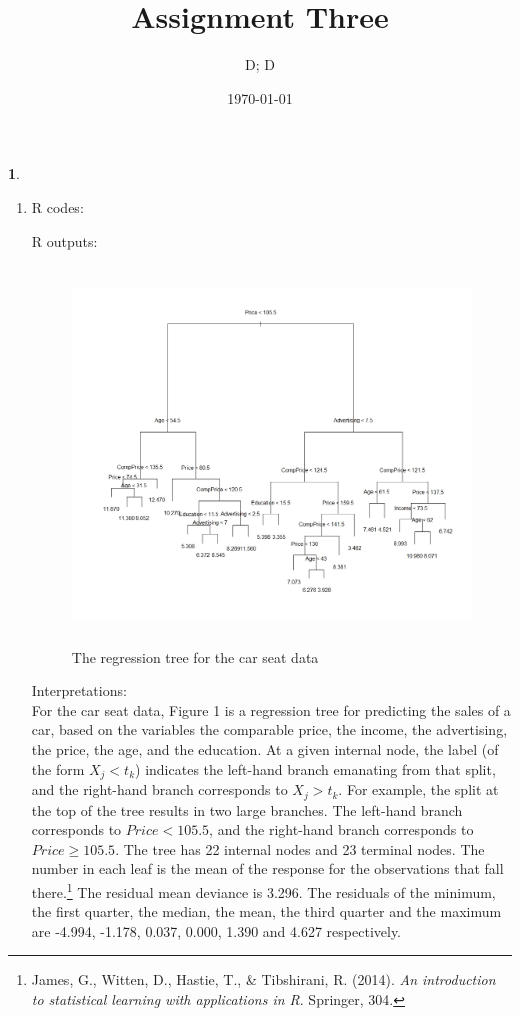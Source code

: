 \documentclass[10pt]{article}
\author{D; D}
\newtheorem{prob}{\bm{$Problem$}}
\begin{document}
\title{Assignment Three}
\date{\today}
\maketitle
\thispagestyle{fancy}
\thispagestyle{fancy}

\begin{prob}
\end{prob}
\begin{enumerate}[1)]
\vspace{3mm}

\item
R codes:

R outputs:

\begin{figure}[H]
  \centering
  \includegraphics[width=12cm,height=10cm]{p11a.jpeg}
  \caption{The regression tree for the car seat data}
\end{figure}
Interpretations:\\
For the car seat data, Figure 1 is a regression tree for predicting the sales of a car, based on the variables the comparable price, the income, the advertising, the price, the age, and the education. At a given internal node, the label (of the form $X_j<t_k$) indicates the left-hand branch emanating from that split, and the right-hand branch corresponds to $X_j>t_k$. For example, the split at the top of the tree results in two large branches. The left-hand branch corresponds to $Price<105.5$, and the right-hand branch corresponds to $Price\geq105.5$. The tree has 22 internal nodes and 23 terminal nodes. The number in each leaf is the mean of the response for the observations that fall there.\footnote{ James, G., Witten, D., Hastie, T., \& Tibshirani, R. (2014). \textit{An introduction to statistical learning with applications in R}. Springer, 304.} The residual mean deviance is 3.296. The residuals of the minimum, the first quarter, the median, the mean, the third quarter and the maximum are -4.994, -1.178, 0.037, 0.000, 1.390 and 4.627 respectively.\\


\end{enumerate}
\end{document}

